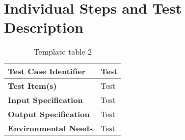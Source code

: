 
\chapter{Individual Steps and Test Description}
\blindtext

\begin{table}[h]
	\begin{tabularx}{\textwidth}{l X}
		\hline
		\textbf{Test Case Identifier}	&	Test\\	\hline
		\textbf{Test Item(s)}			&	Test\\	\hline
		\textbf{Input Specification}	&	Test\\	\hline
		\textbf{Output Specification}	&	Test\\	\hline
		\textbf{Environmental Needs}	&	Test\\	\hline
	\end{tabularx}
	\captionsetup{textformat=empty,labelformat=blank}
	\caption{Template table 2}
	\label{table:template-table-2}
\end{table}
